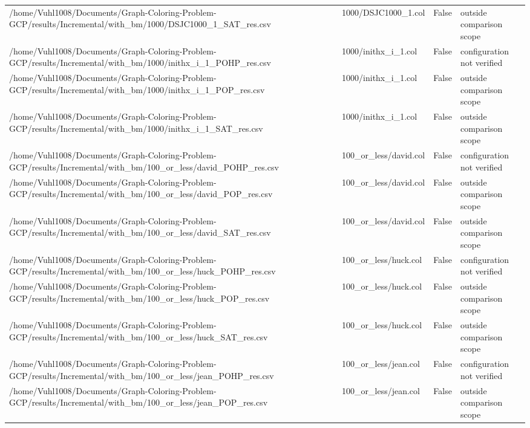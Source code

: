 \begin{table}[htbp]
\begin{tabular}{llll}
/home/Vuhl1008/Documents/Graph-Coloring-Problem-GCP/results/Incremental/with\_bm/1000/DSJC1000\_1\_SAT\_res.csv & 1000/DSJC1000\_1.col & False & outside comparison scope \\
/home/Vuhl1008/Documents/Graph-Coloring-Problem-GCP/results/Incremental/with\_bm/1000/inithx\_i\_1\_POHP\_res.csv & 1000/inithx\_i\_1.col & False & configuration not verified \\
/home/Vuhl1008/Documents/Graph-Coloring-Problem-GCP/results/Incremental/with\_bm/1000/inithx\_i\_1\_POP\_res.csv & 1000/inithx\_i\_1.col & False & outside comparison scope \\
/home/Vuhl1008/Documents/Graph-Coloring-Problem-GCP/results/Incremental/with\_bm/1000/inithx\_i\_1\_SAT\_res.csv & 1000/inithx\_i\_1.col & False & outside comparison scope \\
/home/Vuhl1008/Documents/Graph-Coloring-Problem-GCP/results/Incremental/with\_bm/100\_or\_less/david\_POHP\_res.csv & 100\_or\_less/david.col & False & configuration not verified \\
/home/Vuhl1008/Documents/Graph-Coloring-Problem-GCP/results/Incremental/with\_bm/100\_or\_less/david\_POP\_res.csv & 100\_or\_less/david.col & False & outside comparison scope \\
/home/Vuhl1008/Documents/Graph-Coloring-Problem-GCP/results/Incremental/with\_bm/100\_or\_less/david\_SAT\_res.csv & 100\_or\_less/david.col & False & outside comparison scope \\
/home/Vuhl1008/Documents/Graph-Coloring-Problem-GCP/results/Incremental/with\_bm/100\_or\_less/huck\_POHP\_res.csv & 100\_or\_less/huck.col & False & configuration not verified \\
/home/Vuhl1008/Documents/Graph-Coloring-Problem-GCP/results/Incremental/with\_bm/100\_or\_less/huck\_POP\_res.csv & 100\_or\_less/huck.col & False & outside comparison scope \\
/home/Vuhl1008/Documents/Graph-Coloring-Problem-GCP/results/Incremental/with\_bm/100\_or\_less/huck\_SAT\_res.csv & 100\_or\_less/huck.col & False & outside comparison scope \\
/home/Vuhl1008/Documents/Graph-Coloring-Problem-GCP/results/Incremental/with\_bm/100\_or\_less/jean\_POHP\_res.csv & 100\_or\_less/jean.col & False & configuration not verified \\
/home/Vuhl1008/Documents/Graph-Coloring-Problem-GCP/results/Incremental/with\_bm/100\_or\_less/jean\_POP\_res.csv & 100\_or\_less/jean.col & False & outside comparison scope \\

\end{tabular}
\end{table}
